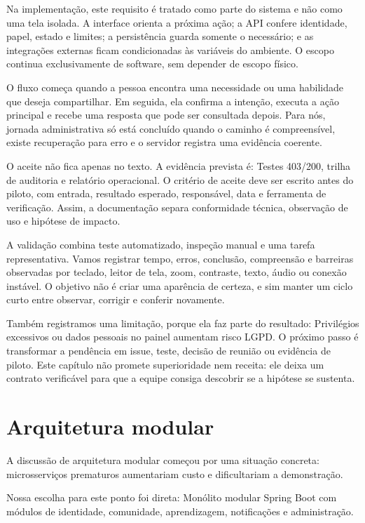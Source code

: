 \documentclass[12pt,oneside,a4paper,article]{abntex2}
\begin{document}
Na implementação, este requisito é tratado como parte do sistema e não como uma tela isolada. A interface orienta a próxima ação; a API confere identidade, papel, estado e limites; a persistência guarda somente o necessário; e as integrações externas ficam condicionadas às variáveis do ambiente. O escopo continua exclusivamente de software, sem depender de escopo físico.

O fluxo começa quando a pessoa encontra uma necessidade ou uma habilidade que deseja compartilhar. Em seguida, ela confirma a intenção, executa a ação principal e recebe uma resposta que pode ser consultada depois. Para nós, jornada administrativa só está concluído quando o caminho é compreensível, existe recuperação para erro e o servidor registra uma evidência coerente.

O aceite não fica apenas no texto. A evidência prevista é: Testes 403/200, trilha de auditoria e relatório operacional. O critério de aceite deve ser escrito antes do piloto, com entrada, resultado esperado, responsável, data e ferramenta de verificação. Assim, a documentação separa conformidade técnica, observação de uso e hipótese de impacto.

A validação combina teste automatizado, inspeção manual e uma tarefa representativa. Vamos registrar tempo, erros, conclusão, compreensão e barreiras observadas por teclado, leitor de tela, zoom, contraste, texto, áudio ou conexão instável. O objetivo não é criar uma aparência de certeza, e sim manter um ciclo curto entre observar, corrigir e conferir novamente.

Também registramos uma limitação, porque ela faz parte do resultado: Privilégios excessivos ou dados pessoais no painel aumentam risco LGPD. O próximo passo é transformar a pendência em issue, teste, decisão de reunião ou evidência de piloto. Este capítulo não promete superioridade nem receita: ele deixa um contrato verificável para que a equipe consiga descobrir se a hipótese se sustenta.

\section{Arquitetura modular}
A discussão de arquitetura modular começou por uma situação concreta: microsserviços prematuros aumentariam custo e dificultariam a demonstração.

Nossa escolha para este ponto foi direta: Monólito modular Spring Boot com módulos de identidade, comunidade, aprendizagem, notificações e administração.
\end{document}
